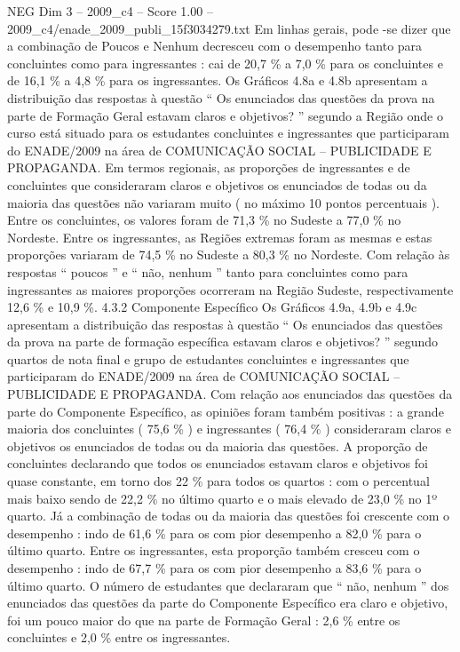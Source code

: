 \begin{textsample}{NEG Dim 3 – 2009\_c4 – Score 1.00 – 2009\_c4/enade\_2009\_publi\_15f3034279.txt}
Em linhas gerais, pode -se dizer que a combinação de Poucos e Nenhum decresceu com o desempenho tanto para concluintes como para ingressantes : cai de 20,7 \% a 7,0 \% para os concluintes e de 16,1 \% a 4,8 \% para os ingressantes.
Os Gráficos 4.8a e 4.8b apresentam a distribuição das respostas à questão “ Os enunciados das questões da prova na parte de Formação Geral estavam claros e objetivos? ” segundo a Região onde o curso está situado para os estudantes concluintes e ingressantes que participaram do ENADE/2009 na área de COMUNICAÇÃO SOCIAL – PUBLICIDADE E PROPAGANDA.
Em termos regionais, as proporções de ingressantes e de concluintes que consideraram claros e objetivos os enunciados de todas ou da maioria das questões não variaram muito ( no máximo 10 pontos percentuais ).
Entre os concluintes, os valores foram de 71,3 \% no Sudeste a 77,0 \% no Nordeste.
Entre os ingressantes, as Regiões extremas foram as mesmas e estas proporções variaram de 74,5 \% no Sudeste a 80,3 \% no Nordeste.
Com relação às respostas “ poucos ” e “ não, nenhum ” tanto para concluintes como para ingressantes as maiores proporções ocorreram na Região Sudeste, respectivamente 12,6 \% e 10,9 \%. 4.3.2 Componente Específico Os Gráficos 4.9a, 4.9b e 4.9c apresentam a distribuição das respostas à questão “ Os enunciados das questões da prova na parte de formação específica estavam claros e objetivos? ” segundo quartos de nota final e grupo de estudantes concluintes e ingressantes que participaram do ENADE/2009 na área de COMUNICAÇÃO SOCIAL – PUBLICIDADE E PROPAGANDA.
Com relação aos enunciados das questões da parte do Componente Específico, as opiniões foram também positivas : a grande maioria dos concluintes ( 75,6 \% ) e ingressantes ( 76,4 \% ) consideraram claros e objetivos os enunciados de todas ou da maioria das questões.
A proporção de concluintes declarando que todos os enunciados estavam claros e objetivos foi quase constante, em torno dos 22 \% para todos os quartos : com o percentual mais baixo sendo de 22,2 \% no último quarto e o mais elevado de 23,0 \% no 1º quarto.
Já a combinação de todas ou da maioria das questões foi crescente com o desempenho : indo de 61,6 \% para os com pior desempenho a 82,0 \% para o último quarto.
Entre os ingressantes, esta proporção também cresceu com o desempenho : indo de 67,7 \% para os com pior desempenho a 83,6 \% para o último quarto.
O número de estudantes que declararam que “ não, nenhum ” dos enunciados das questões da parte do Componente Específico era claro e objetivo, foi um pouco maior do que na parte de Formação Geral : 2,6 \% entre os concluintes e 2,0 \% entre os ingressantes.

\end{textsample}
